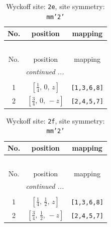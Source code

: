 \documentclass[fleqn,8pt]{jsarticle}
\begin{document}
\begin{longtable}{ccc}
\caption{Wyckoff site: {\tt 2e}, site symmetry: {\tt mm'2'}}
 \\
 \hline \hline
No. & position & mapping \\ \hline \endfirsthead

\multicolumn{2}{l}{\tablename\ \thetable{}} \\
 \hline \hline
No. & position & mapping \\ \hline \endhead

 \hline \hline
\multicolumn{2}{r}{\footnotesize\it continued ...} \\ \endfoot

 \hline \hline
\multicolumn{2}{r}{} \\ \endlastfoot

1 & $\left[ \frac{1}{4},\, 0,\, z \right]$ & {\tt [1,3,6,8]} \\ \hline
2 & $\left[ \frac{3}{4},\, 0,\, - z \right]$ & {\tt [2,4,5,7]} \\
\end{longtable}
\renewcommand{\arraystretch}{1.2}
\begin{longtable}{ccc}
\caption{Wyckoff site: {\tt 2f}, site symmetry: {\tt mm'2'}}
 \\
 \hline \hline
No. & position & mapping \\ \hline \endfirsthead

\multicolumn{2}{l}{\tablename\ \thetable{}} \\
 \hline \hline
No. & position & mapping \\ \hline \endhead

 \hline \hline
\multicolumn{2}{r}{\footnotesize\it continued ...} \\ \endfoot

 \hline \hline
\multicolumn{2}{r}{} \\ \endlastfoot

1 & $\left[ \frac{1}{4},\, \frac{1}{2},\, z \right]$ & {\tt [1,3,6,8]} \\ \hline
2 & $\left[ \frac{3}{4},\, \frac{1}{2},\, - z \right]$ & {\tt [2,4,5,7]} \\
\end{longtable}
\renewcommand{\arraystretch}{1.2}
\end{document}
